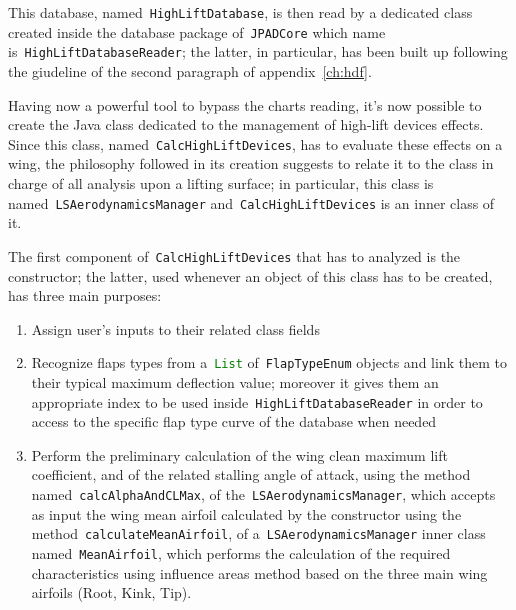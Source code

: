 \bigskip
\noindent
This database, named~\lstinline[language=Java]!HighLiftDatabase!, is then read by a dedicated class created inside the database package of~\lstinline[language=Java]!JPADCore! which name is~\lstinline[language=Java]!HighLiftDatabaseReader!; the latter, in particular, has been built up following the giudeline of the second paragraph of appendix~\ref{ch:hdf}.

\bigskip
\noindent
Having now a powerful tool to bypass the charts reading, it's now possible to create the Java class dedicated to the management of high-lift devices effects. Since this class, named~\lstinline[language=Java]!CalcHighLiftDevices!, has to evaluate these effects on a wing, the philosophy followed in its creation suggests to relate it to the class in charge of all analysis upon a lifting surface; in particular, this class is named~\lstinline[language=Java]!LSAerodynamicsManager! and~\lstinline[language=Java]!CalcHighLiftDevices! is an inner class of it.

\bigskip
\noindent
The first component of~\lstinline[language=Java]!CalcHighLiftDevices! that has to analyzed is the constructor; the latter, used whenever an object of this class has to be created, has three main purposes:

\begin{enumerate}
\item Assign user's inputs to their related class fields
\item Recognize flaps types from a~\lstinline[language=Java]!List! of~\lstinline[language=Java]!FlapTypeEnum! objects and link them to their typical maximum deflection value; moreover it gives them an appropriate index to be used inside~\lstinline[language=Java]!HighLiftDatabaseReader! in order to access to the specific flap type curve of the database when needed
\item Perform the preliminary calculation of the wing clean maximum lift coefficient, and of the related stalling angle of attack, using the method named~\lstinline[language=Java]!calcAlphaAndCLMax!, of the~\lstinline[language=Java]!LSAerodynamicsManager!, which accepts as input the wing mean airfoil calculated by the constructor using the method~\lstinline[language=Java]!calculateMeanAirfoil!, of a~\lstinline[language=Java]!LSAerodynamicsManager! inner class named~\lstinline[language=Java]!MeanAirfoil!, which performs the calculation of the required characteristics using influence areas method based on the three main wing airfoils (Root, Kink, Tip).   
\end{enumerate}

